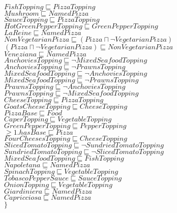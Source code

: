 \documentclass[a4paper,10pt]{article}
\begin{document}
 $FishTopping \sqsubseteq PizzaTopping$\\ 
 $Mushroom \sqsubseteq NamedPizza$\\ 
 $SauceTopping \sqsubseteq PizzaTopping$\\ 
 $HotGreenPepperTopping \sqsubseteq GreenPepperTopping$\\ 
 $LaReine \sqsubseteq NamedPizza$\\ 
 $NonVegetarianPizza \sqsubseteq  ( Pizza   \sqcap    \lnot VegetarianPizza ) $\\ 
 $ ( Pizza   \sqcap    \lnot VegetarianPizza )  \sqsubseteq NonVegetarianPizza$\\ 
 $Veneziana \sqsubseteq NamedPizza$\\ 
 $AnchoviesTopping \sqsubseteq  \lnot MixedSeafoodTopping$\\ 
 $AnchoviesTopping \sqsubseteq  \lnot PrawnsTopping$\\ 
 $MixedSeafoodTopping \sqsubseteq  \lnot AnchoviesTopping$\\ 
 $MixedSeafoodTopping \sqsubseteq  \lnot PrawnsTopping$\\ 
 $PrawnsTopping \sqsubseteq  \lnot AnchoviesTopping$\\ 
 $PrawnsTopping \sqsubseteq  \lnot MixedSeafoodTopping$\\ 
 $CheeseTopping \sqsubseteq PizzaTopping$\\ 
 $GoatsCheeseTopping \sqsubseteq CheeseTopping$\\ 
 $PizzaBase \sqsubseteq Food$\\ 
 $CaperTopping \sqsubseteq VegetableTopping$\\ 
 $GreenPepperTopping \sqsubseteq PepperTopping$\\ 
 $ \ge 1.hasBase \sqsubseteq Pizza$\\ 
 $FourCheesesTopping \sqsubseteq CheeseTopping$\\ 
 $SlicedTomatoTopping \sqsubseteq  \lnot SundriedTomatoTopping$\\ 
 $SundriedTomatoTopping \sqsubseteq  \lnot SlicedTomatoTopping$\\ 
 $MixedSeafoodTopping \sqsubseteq FishTopping$\\ 
 $Napoletana \sqsubseteq NamedPizza$\\ 
 $SpinachTopping \sqsubseteq VegetableTopping$\\ 
 $TobascoPepperSauce \sqsubseteq SauceTopping$\\ 
 $OnionTopping \sqsubseteq VegetableTopping$\\ 
 $Giardiniera \sqsubseteq NamedPizza$\\ 
 $Capricciosa \sqsubseteq NamedPizza$\\ 
 $\}$ 
\end{document}
